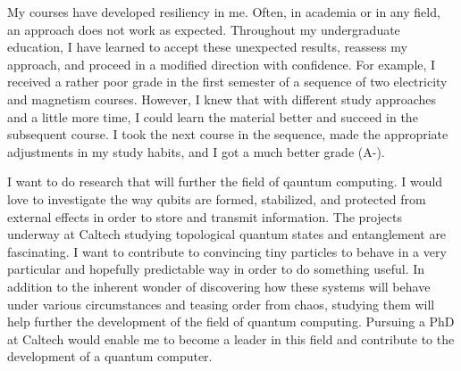 {    My courses have developed resiliency in me. Often, in academia or in any
    field, an approach does not work as expected. Throughout my undergraduate
    education, I have learned to accept these unexpected results, reassess my
    approach, and proceed in a modified direction with confidence.  For
    example, I received a rather poor grade in the first semester of a sequence
    of two electricity and magnetism courses. However, I knew that with
    different study approaches and a little more time, I could learn the
    material better and succeed in the subsequent course. I took the next
    course in the sequence, made the appropriate adjustments in my study
    habits, and I got a much better grade (A-).

    I want to do research that will further the field of qauntum computing. I
    would love to investigate the way qubits are formed, stabilized, and
    protected from external effects in order to store and transmit information.
    The projects underway at Caltech studying topological quantum states and
    entanglement are fascinating. I want to contribute to convincing tiny
    particles to behave in a very particular and hopefully predictable way in
    order to do something useful. In addition to the inherent wonder of
    discovering how these systems will behave under various circumstances and
    teasing order from chaos, studying them will help further the development
    of the field of quantum computing. Pursuing a PhD at Caltech would enable
    me to become a leader in this field and contribute to the development of a
quantum computer.  }



